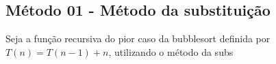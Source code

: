 \subsection{Método 01 - Método da substituição}
Seja a função recursiva do pior caso da bubblesort definida por $T(n) = T(n-1) + n$, utilizando o método da subs